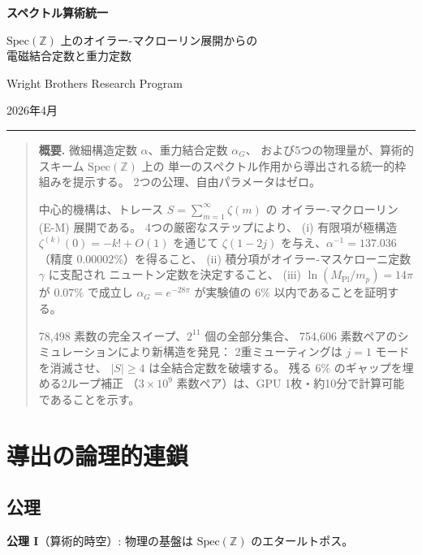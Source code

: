\documentclass[11pt,a4paper]{article}
\newcommand{\Spec}{\mathrm{Spec}}
\begin{document}
\begin{center}
{\LARGE\bfseries スペクトル算術統一}

\medskip

{\large $\Spec(\mathbb{Z})$ 上のオイラー-マクローリン展開からの\\
電磁結合定数と重力定数}

\bigskip

{\large Wright Brothers Research Program}

\medskip

2026年4月

\rule{12cm}{0.4pt}
\end{center}

\begin{quotation}
\noindent\textbf{概要.}\quad
微細構造定数 $\alpha$、重力結合定数 $\alpha_G$、
および5つの物理量が、算術的スキーム $\Spec(\mathbb{Z})$ 上の
単一のスペクトル作用から導出される統一的枠組みを提示する。
2つの公理、自由パラメータはゼロ。

中心的機構は、トレース $S=\sum_{m=1}^\infty\zeta(m)$ の
オイラー-マクローリン (E-M) 展開である。
4つの厳密なステップにより、
(i) 有限項が極構造 $\zeta^{(k)}(0)=-k!+O(1)$ を通じて
$\zeta(1-2j)$ を与え、$\alpha^{-1}=137.036$（精度 $0.00002\%$）を得ること、
(ii) 積分項がオイラー-マスケローニ定数 $\gamma$ に支配され
ニュートン定数を決定すること、
(iii) $\ln(M_{\mathrm{Pl}}/m_p)=14\pi$ が $0.07\%$ で成立し
$\alpha_G=e^{-28\pi}$ が実験値の $6\%$ 以内であることを証明する。

78,498 素数の完全スイープ、$2^{11}$ 個の全部分集合、
754,606 素数ペアのシミュレーションにより新構造を発見：
2重ミューティングは $j=1$ モードを消滅させ、
$|S|\geq 4$ は全結合定数を破壊する。
残る $6\%$ のギャップを埋める2ループ補正
（$3\times 10^9$ 素数ペア）は、GPU 1枚・約10分で計算可能であることを示す。
\end{quotation}

\bigskip

\section{導出の論理的連鎖}

\subsection{公理}

\noindent\textbf{公理 I}（算術的時空）:
物理の基盤は $\Spec(\mathbb{Z})$ のエタールトポス。
\end{document}
